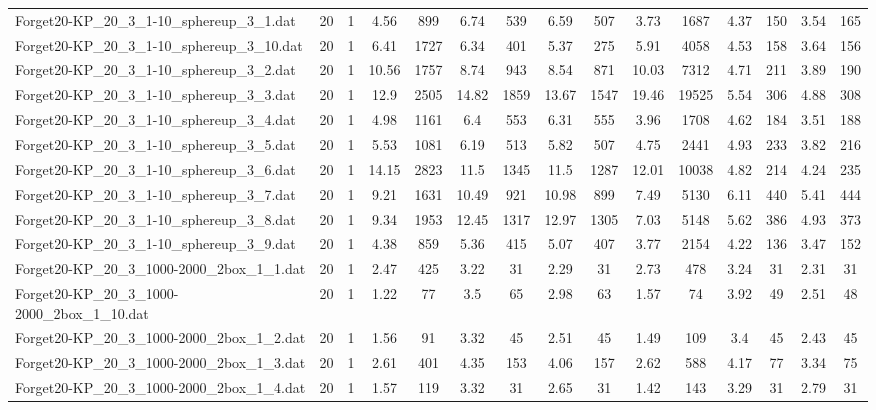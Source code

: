 \begin{table}[!ht]
{\begin{tabular}{lcccccccccccccc}
Forget20-KP\_20\_3\_1-10\_sphereup\_3\_1.dat & 20 & 1 & 4.56 & 899 & 6.74 & 539 & 6.59 & 507 & 3.73 & 1687 & 4.37 & 150 & 3.54 & 165 \\
Forget20-KP\_20\_3\_1-10\_sphereup\_3\_10.dat & 20 & 1 & 6.41 & 1727 & 6.34 & 401 & 5.37 & 275 & 5.91 & 4058 & 4.53 & 158 & 3.64 & 156 \\
Forget20-KP\_20\_3\_1-10\_sphereup\_3\_2.dat & 20 & 1 & 10.56 & 1757 & 8.74 & 943 & 8.54 & 871 & 10.03 & 7312 & 4.71 & 211 & 3.89 & 190 \\
Forget20-KP\_20\_3\_1-10\_sphereup\_3\_3.dat & 20 & 1 & 12.9 & 2505 & 14.82 & 1859 & 13.67 & 1547 & 19.46 & 19525 & 5.54 & 306 & 4.88 & 308 \\
Forget20-KP\_20\_3\_1-10\_sphereup\_3\_4.dat & 20 & 1 & 4.98 & 1161 & 6.4 & 553 & 6.31 & 555 & 3.96 & 1708 & 4.62 & 184 & 3.51 & 188 \\
Forget20-KP\_20\_3\_1-10\_sphereup\_3\_5.dat & 20 & 1 & 5.53 & 1081 & 6.19 & 513 & 5.82 & 507 & 4.75 & 2441 & 4.93 & 233 & 3.82 & 216 \\
Forget20-KP\_20\_3\_1-10\_sphereup\_3\_6.dat & 20 & 1 & 14.15 & 2823 & 11.5 & 1345 & 11.5 & 1287 & 12.01 & 10038 & 4.82 & 214 & 4.24 & 235 \\
Forget20-KP\_20\_3\_1-10\_sphereup\_3\_7.dat & 20 & 1 & 9.21 & 1631 & 10.49 & 921 & 10.98 & 899 & 7.49 & 5130 & 6.11 & 440 & 5.41 & 444 \\
Forget20-KP\_20\_3\_1-10\_sphereup\_3\_8.dat & 20 & 1 & 9.34 & 1953 & 12.45 & 1317 & 12.97 & 1305 & 7.03 & 5148 & 5.62 & 386 & 4.93 & 373 \\
Forget20-KP\_20\_3\_1-10\_sphereup\_3\_9.dat & 20 & 1 & 4.38 & 859 & 5.36 & 415 & 5.07 & 407 & 3.77 & 2154 & 4.22 & 136 & 3.47 & 152 \\
Forget20-KP\_20\_3\_1000-2000\_2box\_1\_1.dat & 20 & 1 & 2.47 & 425 & 3.22 & 31 & 2.29 & 31 & 2.73 & 478 & 3.24 & 31 & 2.31 & 31 \\
Forget20-KP\_20\_3\_1000-2000\_2box\_1\_10.dat & 20 & 1 & 1.22 & 77 & 3.5 & 65 & 2.98 & 63 & 1.57 & 74 & 3.92 & 49 & 2.51 & 48 \\
Forget20-KP\_20\_3\_1000-2000\_2box\_1\_2.dat & 20 & 1 & 1.56 & 91 & 3.32 & 45 & 2.51 & 45 & 1.49 & 109 & 3.4 & 45 & 2.43 & 45 \\
Forget20-KP\_20\_3\_1000-2000\_2box\_1\_3.dat & 20 & 1 & 2.61 & 401 & 4.35 & 153 & 4.06 & 157 & 2.62 & 588 & 4.17 & 77 & 3.34 & 75 \\
Forget20-KP\_20\_3\_1000-2000\_2box\_1\_4.dat & 20 & 1 & 1.57 & 119 & 3.32 & 31 & 2.65 & 31 & 1.42 & 143 & 3.29 & 31 & 2.79 & 31 \\

\end{tabular}}
\end{table}
